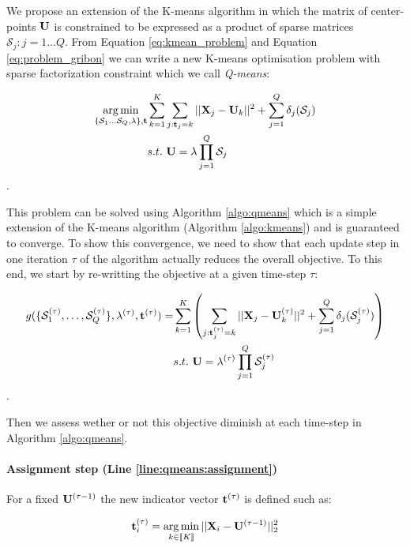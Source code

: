 \documentclass{article}
\begin{document}
We propose an extension of the K-means algorithm in which the matrix of center-points ${\mathbf{U}}$ is constrained to be expressed as a product of sparse matrices $\mathcal{S}_j: j = 1 \ldots Q$. From Equation \ref{eq:kmean_problem} and Equation \ref{eq:problem_gribon} we can write a new K-means optimisation problem with sparse factorization constraint which we call \textit{Q-means}:

\begin{equation}
\begin{split}
\label{eq:qmean_problem}
    \operatorname*{arg\,min}_{\{\mathcal{S}_1 \dots \mathcal{S}_Q, \lambda\}, {\mathbf{t}}} & \sum_{k=1}^{K} \sum_{j: {\mathbf{t}}_j = k} ||{\mathbf{X}}_j -{\mathbf{U}}_k||^2 + \sum_{j=1}^{Q} \delta_j(\mathcal{S}_j) \\
    & s.t. ~ {\mathbf{U}} = \lambda \prod_{j=1}^{Q}{\mathcal{S}_j}
\end{split}
\end{equation}.

This problem can be solved using Algorithm \ref{algo:qmeans} which is a simple extension of the K-means algorithm (Algorithm \ref{algo:kmeans}) and is guaranteed to converge. To show this convergence, we need to show that each update step in one iteration $\tau$ of the algorithm actually reduces the overall objective. To this end, we start by re-writting the objective at a given time-step $\tau$:

\begin{equation}
\begin{split}
\label{eq:qmean_problem_2}
    g(\{ \mathcal{S}_1^{(\tau)}, \ldots,\mathcal{S}_Q^{(\tau)} \}, \lambda^{(\tau)}, {\mathbf{t}}^{(\tau)}) = & \sum_{k=1}^{K} \left( \sum_{j: {\mathbf{t}}^{(\tau)}_j = k} ||{\mathbf{X}}_j - {\mathbf{U}}^{(\tau)}_k||^2 + \sum_{j=1}^{Q} \delta_j(\mathcal{S}_j^{(\tau)}) \right)\\
    & s.t. ~ {\mathbf{U}} = \lambda^{(\tau)} \prod_{j=1}^{Q}{\mathcal{S}_j^{(\tau)}}
\end{split}
\end{equation}.

Then we assess wether or not this objective diminish at each time-step in Algorithm \ref{algo:qmeans}.

\paragraph{Assignment step (Line \ref{line:qmeans:assignment})} For a fixed ${\mathbf{U}}^{(\tau-1)}$ the new indicator vector ${\mathbf{t}}^{(\tau)}$ is defined such as:

\begin{equation}
 {\mathbf{t}}^{(\tau)}_i = \operatorname*{arg\,min}_{k \in [\![K]\!]} ||{\mathbf{X}}_i - {\mathbf{U}}^{(\tau-1)}||_2^2
\end{equation}
\end{document}
